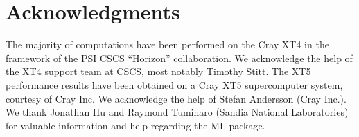 \documentclass[a4paper,10pt,3p,final,pdftex]{elsarticle}
\begin{document}
\section*{Acknowledgments}

The majority of computations have been performed on the Cray XT4 in the
framework of the PSI CSCS ``Horizon'' collaboration.  We acknowledge the
help of the XT4 support team at CSCS, most notably Timothy Stitt.
The XT5 performance results have been obtained on a Cray XT5
supercomputer system, courtesy of Cray Inc.  We acknowledge the help of
Stefan Andersson (Cray Inc.).
We thank Jonathan Hu and Raymond Tuminaro (Sandia National Laboratories)
for valuable information and help regarding the ML package.



\end{document}
